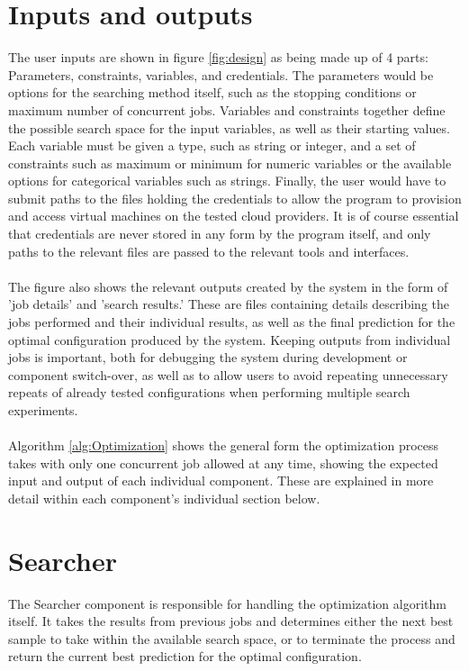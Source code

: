 \documentclass{report}
\begin{document}
\section{Inputs and outputs}
The user inputs are shown in figure \ref{fig:design} as being made up of 4 parts: Parameters, constraints, variables, and credentials. The parameters would be options for the searching method itself, such as the stopping conditions or maximum number of concurrent jobs. Variables and constraints together define the possible search space for the input variables, as well as their starting values. Each variable must be given a type, such as string or integer, and a set of constraints such as maximum or minimum for numeric variables or the available options for categorical variables such as strings. Finally, the user would have to submit paths to the files holding the credentials to allow the program to provision and access virtual machines on the tested cloud providers. It is of course essential that credentials are never stored in any form by the program itself, and only paths to the relevant files are passed to the relevant tools and interfaces.
\paragraph{}
The figure also shows the relevant outputs created by the system in the form of 'job details' and 'search results.' These are files containing details describing the jobs performed and their individual results, as well as the final prediction for the optimal configuration produced by the system. Keeping outputs from individual jobs is important, both for debugging the system during development or component switch-over, as well as to allow users to avoid repeating unnecessary repeats of already tested configurations when performing multiple search experiments.
\paragraph{}
Algorithm \ref{alg:Optimization} shows the general form the optimization process takes with only one concurrent job allowed at any time, showing the expected input and output of each individual component. These are explained in more detail within each component's individual section below.

\section{Searcher}
The Searcher component is responsible for handling the optimization algorithm itself. It takes the results from previous jobs and determines either the next best sample to take within the available search space, or to terminate the process and return the current best prediction for the optimal configuration. 
\end{document}
